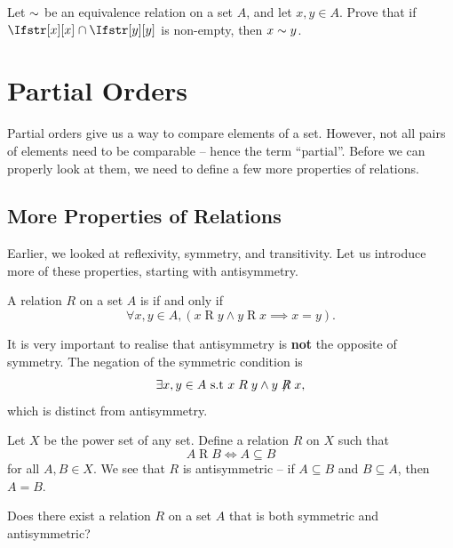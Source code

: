 \begin{exercise}\label{exercise:equivalence-class-equivalence}
    Let $\sim$ be an equivalence relation on a set $A$, and let $x, y \in A$. Prove that if $\EqClass{x} \cap \EqClass{y}$ is non-empty, then $x \sim y$.
\end{exercise}

\section{Partial Orders}
Partial orders give us a way to compare elements of a set. However, not all pairs of elements need to be comparable -- hence the term ``partial''. Before we can properly look at them, we need to define a few more properties of relations.

\subsection{More Properties of Relations}
Earlier, we looked at reflexivity, symmetry, and transitivity. Let us introduce more of these properties, starting with antisymmetry.

\begin{definition}[Antisymmetry]
    A relation $R$ on a set $A$ is  if and only if
    \[
        \forall x, y \in A, (x\mathrel{R}y \land y\mathrel{R}x \implies x = y).
    \]
\end{definition}
\begin{remark}
    It is very important to realise that antisymmetry is \textbf{not} the opposite of symmetry. The negation of the symmetric condition is
    \[
        \exists x, y \in A \text{ s.t } x\mathrel{R}y \land y\not\mathrel{R}x,
    \]
    which is distinct from antisymmetry.
\end{remark}

\begin{example}
    Let $X$ be the power set of any set. Define a relation $R$ on $X$ such that
    \[
        A \mathrel{R} B \iff A \subseteq B
    \]
    for all $A, B \in X$. We see that $R$ is antisymmetric -- if $A \subseteq B$ and $B \subseteq A$, then $A = B$.
\end{example}

\begin{exercise}
    Does there exist a relation $R$ on a set $A$ that is both symmetric and antisymmetric?
\end{exercise}

